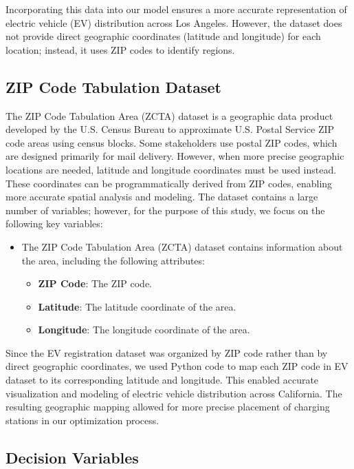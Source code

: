 Incorporating this data into our model ensures a more accurate representation of electric vehicle (EV) distribution across Los Angeles. However, the dataset does not provide direct geographic coordinates (latitude and longitude) for each location; instead, it uses ZIP codes to identify regions. 


\subsection{ ZIP Code Tabulation Dataset}
The ZIP Code Tabulation Area (ZCTA) dataset \cite{ZCTAs} is a geographic data product developed by the U.S. Census Bureau to approximate U.S. Postal Service ZIP code areas using census blocks\cite{ZCTAs}. Some stakeholders use postal ZIP codes, which are designed primarily for mail delivery. However, when more precise geographic locations are needed, latitude and longitude coordinates must be used instead. These coordinates can be programmatically derived from ZIP codes, enabling more accurate spatial analysis and modeling. The dataset contains a large number of variables; however, for the purpose of this study, we focus on the following key variables:

\begin{itemize}
    \item The ZIP Code Tabulation Area (ZCTA) dataset contains information about the area, including the following attributes:
    \begin{itemize}
        \item \textbf{ZIP Code}: The ZIP code.
        \item \textbf{Latitude}: The latitude coordinate of the area.
        \item \textbf{Longitude}: The longitude coordinate of the area.
    \end{itemize}
\end{itemize}

Since the EV registration dataset was organized by ZIP code rather than by direct geographic coordinates, we used Python code to map each ZIP code in EV dataset to its corresponding latitude and longitude. This enabled accurate visualization and modeling of electric vehicle distribution across California. The resulting geographic mapping allowed for more precise placement of charging stations in our optimization process.

\subsection{Decision Variables}

